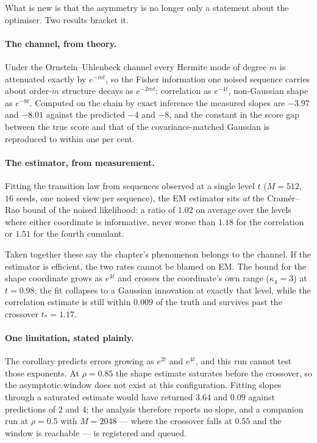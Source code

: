 \documentclass[11pt,a4paper]{article}
\begin{document}
What is new is that the asymmetry is no longer only a statement about the optimiser. Two results
bracket it.

\paragraph{The channel, from theory.}
Under the Ornstein--Uhlenbeck channel every Hermite mode of degree $m$ is attenuated exactly by
$e^{-mt}$, so the Fisher information one noised sequence carries about order-$m$ structure decays
as $e^{-2mt}$: correlation as $e^{-4t}$, non-Gaussian shape as $e^{-8t}$. Computed on the chain by
exact inference the measured slopes are $-3.97$ and $-8.01$ against the predicted $-4$ and $-8$,
and the constant in the score gap between the true score and that of the covariance-matched
Gaussian is reproduced to within one per cent.

\paragraph{The estimator, from measurement.}
Fitting the transition law from sequences observed at a single level $t$ ($M=512$, $16$ seeds, one
noised view per sequence), the EM estimator sits \emph{at} the Cram\'er--Rao bound of the noised
likelihood: a ratio of $1.02$ on average over the levels where either coordinate is informative,
never worse than $1.18$ for the correlation or $1.51$ for the fourth cumulant.

\medskip
\noindent
Taken together these say the chapter's phenomenon belongs to the channel. If the estimator is
efficient, the two rates cannot be blamed on EM. The bound for the shape coordinate grows as
$e^{4t}$ and crosses the coordinate's own range ($\kappa_4=3$) at $t=0.98$; the fit collapses to a
Gaussian innovation at exactly that level, while the correlation estimate is still within $0.009$
of the truth and survives past the crossover $t_*=1.17$.

\paragraph{One limitation, stated plainly.}
The corollary predicts errors growing as $e^{2t}$ and $e^{4t}$, and this run cannot test those
exponents. At $\rho=0.85$ the shape estimate saturates before the crossover, so the asymptotic
window does not exist at this configuration. Fitting slopes through a saturated estimate would
have returned $3.64$ and $0.09$ against predictions of $2$ and $4$; the analysis therefore reports
no slope, and a companion run at $\rho=0.5$ with $M=2048$ --- where the crossover falls at $0.55$
and the window is reachable --- is registered and queued.
\end{document}
